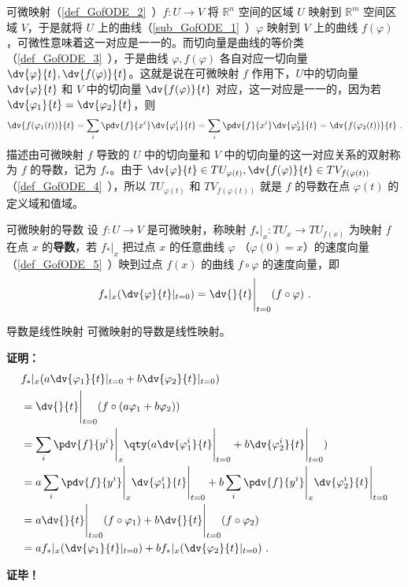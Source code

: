 
可微映射（\autoref{def_GofODE_2}~）$f:U\rightarrow V$ 将 $\mathbb R^n$ 空间的区域 $U$ 映射到 $\mathbb R^m$ 空间区域 $V$，于是就将 $U$ 上的曲线（\autoref{sub_GofODE_1}~）$\varphi$ 映射到 $V$ 上的曲线 $f(\varphi)$，可微性意味着这一对应是一一的。而切向量是曲线的等价类（\autoref{def_GofODE_3}~），于是曲线 $\varphi,f(\varphi)$ 各自对应一切向量 $\dv{\varphi}{t},\dv{f(\varphi)}{t}$。这就是说在可微映射 $f$ 作用下，$U$中的切向量 $\dv{\varphi}{t}$ 和 $V$ 中的切向量 $\dv{f(\varphi)}{t}$ 对应，这一对应是一一的，因为若 $\dv{\varphi_1}{t}=\dv{\varphi_2}{t}$，则
\begin{equation}\label{eq_DoDifM_1}
\dv{f(\varphi_1(t))}{t}=\sum_i\pdv{f}{x^i}\dv{\varphi^i_1}{t}=\sum_i\pdv{f}{x^i}\dv{\varphi^i_2}{t}=\dv{f(\varphi_2(t))}{t}~.
\end{equation}
描述由可微映射 $f$ 导致的 $U$ 中的切向量和 $V$ 中的切向量的这一对应关系的双射称为 $f$ 的导数，记为 $f_*$。由于 $\dv{\varphi}{t}\in TU_{\varphi(t)} ,\dv{f(\varphi)}{t}\in TV_{f(\varphi(t))}$ （\autoref{def_GofODE_4}~），所以 $TU_{\varphi(t)}$ 和 $TV_{f(\varphi(t))}$ 就是 $f$ 的导数在点 $\varphi(t)$ 的定义域和值域。

\begin{definition}{可微映射的导数}
设 $f:U\rightarrow V$ 是可微映射，称映射 $f_*|_x:TU_x\rightarrow TU_{f(x)}$ 为映射 $f$ 在点 $x$ 的\textbf{导数}，若 $f_*|_x$ 把过点 $x$ 的任意曲线 $\varphi$ （$\varphi(0)=x$）的速度向量（\autoref{def_GofODE_5}~）映到过点 $f(x)$ 的曲线 $f\circ\varphi$ 的速度向量，即
\begin{equation}
f_*|_x(\dv{\varphi}{t}|_{t=0})=\dv{}{t}\Bigg|_{t=0}(f\circ\varphi)~.
\end{equation}
\end{definition}

\begin{theorem}{导数是线性映射}
可微映射的导数是线性映射。
\end{theorem}
\textbf{证明：}
\begin{equation}
\begin{aligned}
&f_*|_x(a\dv{\varphi_1}{t}|_{t=0}+b\dv{\varphi_2}{t}|_{t=0})\\
&=\dv{}{t}\Bigg|_{t=0}(f\circ(a\varphi_1+b\varphi_2))\\
&=\sum_i\pdv{f}{y^i}\Bigg|_{x}\qty(a\dv{\varphi^i_1}{t}\Bigg|_{t=0}+b\dv{\varphi^i_2}{t}\Bigg|_{t=0})\\
&=a\sum_i\pdv{f}{y^i}\Bigg|_{x}\dv{\varphi^i_1}{t}\Bigg|_{t=0}+b\sum_i\pdv{f}{y^i}\Bigg|_{x}\dv{\varphi^i_2}{t}\Bigg|_{t=0}\\
&=a\dv{}{t}\Bigg|_{t=0}(f\circ\varphi_1)+b\dv{}{t}\Bigg|_{t=0}(f\circ\varphi_2)\\
&=af_*|_x(\dv{\varphi_1}{t}|_{t=0})+bf_*|_x(\dv{\varphi_2}{t}|_{t=0})~.
\end{aligned}
\end{equation}



\textbf{证毕！}